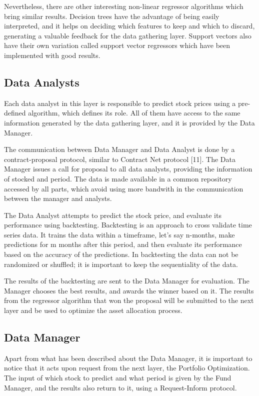 \documentclass[prodmode,acmtecs]{acmsmall} %
\begin{document}
Nevertheless, there are other interesting non-linear regressor algorithms which bring similar results. Decision trees have the advantage of being easily interpreted, and it helps on deciding which features to keep and which to discard, generating a valuable feedback for the data gathering layer. Support vectors also have their own variation called support vector regressors which have been implemented with good results. 

\subsection {Data Analysts}

Each data analyst in this layer is responsible to predict stock prices using a pre-defined algorithm, which defines its role. All of them have access to the same information generated by the data gathering layer, and it is provided by the Data Manager.

The communication between Data Manager and Data Analyst is done by a contract-proposal protocol, similar to Contract Net protocol [11]. The Data Manager issues a call for proposal to all data analysts, providing the information of stocked and period. The data is made available in a common repository accessed by all parts, which avoid using more bandwith in the communication between the manager and analysts.

The Data Analyst attempts to predict the stock price, and evaluate its performance using backtesting. Backtesting is an approach to cross validate time series data. It trains the data within a timeframe, let’s say n-months, make predictions for m months after this period, and then evaluate its performance based on the accuracy of the predictions. In backtesting the data can not be randomized or shuffled; it is important to keep the sequentiality of the data. 

The results of the backtesting are sent to the Data Manager for evaluation. The Manager chooses the best results, and awards the winner based on it. The results from the regressor algorithm that won the proposal will be submitted to the next layer and be used to optimize the asset allocation process.

\subsection {Data Manager}

Apart from what has been described about the Data Manager, it is important to notice that it acts upon request from the next layer, the Portfolio Optimization. The input of which stock to predict and what period is given by the Fund Manager, and the results also return to it, using a Request-Inform protocol.
\end{document}
